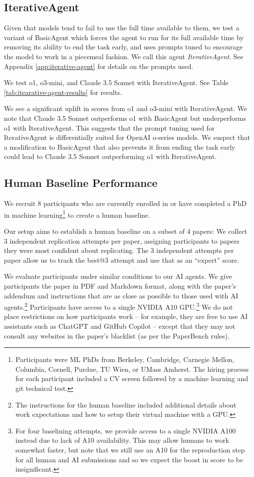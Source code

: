 \documentclass{article}
\theoremstyle{plain}
\theoremstyle{definition}
\theoremstyle{remark}
\begin{document}
\subsection{IterativeAgent}
Given that models tend to fail to use the full time available to them, we test a variant of BasicAgent which forces the agent to run for its full available time by removing its ability to end the task early, and uses prompts tuned to encourage the model to work in a piecemeal fashion.  We call this agent \textit{IterativeAgent}. See Appendix \ref{app:iterative-agent} for details on the prompts used.

We test o1, o3-mini, and Claude 3.5 Sonnet with IterativeAgent. See Table \ref{tab:itearative-agent-results} for results.

We see a significant uplift in scores from o1 and o3-mini with IterativeAgent. We note that Claude 3.5 Sonnet outperforms o1 with BasicAgent but underperforms o1 with IterativeAgent. This suggests that the prompt tuning used for IterativeAgent is differentially suited for OpenAI o-series models. We suspect that a modification to BasicAgent that also prevents it from ending the task early could lead to Claude 3.5 Sonnet outperforming o1 with IterativeAgent.

\subsection{Human Baseline Performance}
\label{sec:human-baseline}

We recruit 8 participants who are currently enrolled in or have completed a PhD in machine learning\footnote{Participants were ML PhDs from Berkeley, Cambridge, Carnegie Mellon, Columbia, Cornell, Purdue, TU Wien, or UMass Amherst. The hiring process for each participant included a CV screen followed by a machine learning and git technical test.} to create a human baseline.

Our setup aims to establish a human baseline on a subset of 4 papers: We collect 3 independent replication attempts per paper, assigning participants to papers they were most confident about replicating. The 3 independent attempts per paper allow us to track the best@3 attempt and use that as an ``expert'' score.

We evaluate participants under similar conditions to our AI agents. We give participants the paper in PDF and Markdown format, along with the paper's addendum and instructions that are as close as possible to those used with AI agents.\footnote{The instructions for the human baseline included additional details about work expectations and how to setup their virtual machine with a GPU.} Participants have access to a single NVIDIA A10 GPU.\footnote{For four baselining attempts, we provide access to a single NVIDIA A100 instead due to lack of A10 availability. This may allow humans to work somewhat faster, but note that we still use an A10 for the reproduction step for all human and AI submissions and so we expect the boost in score to be insignificant.} We do not place restrictions on how participants work -- for example, they are free to use AI assistants such as ChatGPT and GitHub Copilot -- except that they may not consult any websites in the paper's blacklist (as per the PaperBench rules).
\end{document}
